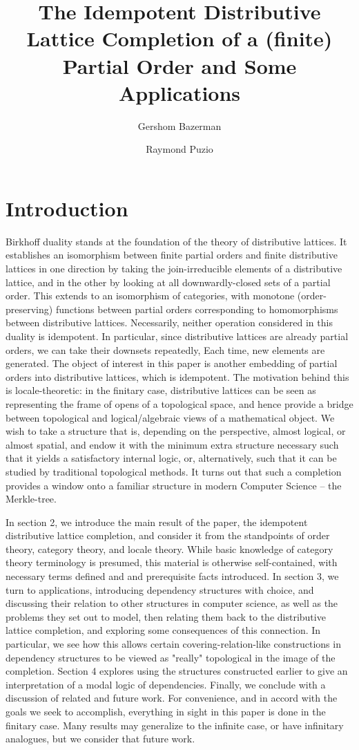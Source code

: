 \documentclass[hoptionsi,review,format=sigplan]{acmart}
\title[Idempotent Distributive Lattice Completion]{The Idempotent Distributive Lattice Completion of a (finite) Partial Order and Some Applications}
\author{Gershom Bazerman}
\affiliation{Awake Security}
\author{Raymond Puzio}
\affiliation{Albert Einstein Institute}
\theoremstyle{definition}
\begin{document}
\maketitle

\section{Introduction}

Birkhoff duality stands at the foundation of the theory of distributive lattices. It establishes an isomorphism between finite partial orders and finite distributive lattices in one direction by taking the join-irreducible elements of a distributive lattice, and in the other by looking at all downwardly-closed sets of a partial order. This extends to an isomorphism of categories, with monotone (order-preserving) functions between partial orders corresponding to homomorphisms between distributive lattices. Necessarily, neither operation considered in this duality is idempotent. In particular, since distributive lattices are already partial orders, we can take their downsets repeatedly, Each time, new elements are generated. The object of interest in this paper is another embedding of partial orders into distributive lattices, which is idempotent. The motivation behind this is locale-theoretic: in the finitary case, distributive lattices can be seen as representing the frame of opens of a topological space, and hence provide a bridge between topological and logical/algebraic views of a mathematical object. We wish to take a structure that is, depending on the perspective, almost logical, or almost spatial, and endow it with the minimum extra structure necessary such that it yields a satisfactory internal logic, or, alternatively, such that it can be studied by traditional topological methods. It turns out that such a completion provides a window onto a familiar structure in modern Computer Science -- the Merkle-tree.

In section 2, we introduce the main result of the paper, the idempotent distributive lattice completion, and consider it from the standpoints of order theory, category theory, and locale theory. While basic knowledge of category theory terminology is presumed, this material is otherwise self-contained, with necessary terms defined and and prerequisite facts introduced. In section 3, we turn to applications, introducing dependency structures with choice, and discussing their relation to other structures in computer science, as well as the problems they set out to model, then relating them back to the distributive lattice completion, and exploring some consequences of this connection. In particular, we see how this allows certain covering-relation-like constructions in dependency structures to be viewed as "really" topological in the image of the completion. Section 4 explores using the structures constructed earlier to give an interpretation of a modal logic of dependencies. Finally, we conclude with a discussion of related and future work. For convenience, and in accord with the goals we seek to accomplish, everything in sight in this paper is done in the finitary case. Many results may generalize to the infinite case, or have infinitary analogues, but we consider that future work.
\end{document}
